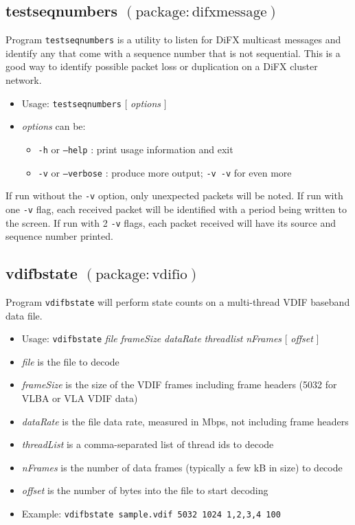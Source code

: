 \subsection{testseqnumbers {\small $\mathrm{(package: difxmessage)}$}} \label{sec:testsequnumbers} 

Program {\tt testseqnumbers} is a utility to listen for DiFX multicast messages and identify any that come with a sequence number that is not sequential.
This is a good way to identify possible packet loss or duplication on a DiFX cluster network.

\begin{itemize}
\item[] Usage: {\tt testseqnumbers} $[$ {\em options} $]$
\item[] {\em options} can be:
\begin{itemize}
\item[] {\tt -h} or {\tt --help} : print usage information and exit
\item[] {\tt -v} or {\tt --verbose} : produce more output; {\tt -v -v} for even more
\end{itemize}
\end{itemize}

If run without the {\tt -v} option, only unexpected packets will be noted.
If run with one {\tt -v} flag, each received packet will be identified with a period being written to the screen.
If run with 2 {\tt -v} flags, each packet received will have its source and sequence number printed.







\subsection{vdifbstate {\small $\mathrm{(package: vdifio)}$}} \label{sec:vbstate}

Program {\tt vdifbstate} will perform state counts on a multi-thread VDIF baseband data file.

\begin{itemize}
\item[] Usage: {\tt vdifbstate} {\em file} {\em frameSize} {\em dataRate} {\em threadlist} {\em nFrames} $[$ {\em offset} $]$ 
\item[] {\em file} is the file to decode
\item[] {\em frameSize} is the size of the VDIF frames including frame headers (5032 for VLBA or VLA VDIF data)
\item[] {\em dataRate} is the file data rate, measured in Mbps, not including frame headers
\item[] {\em threadList} is a comma-separated list of thread ids to decode
\item[] {\em nFrames} is the number of data frames (typically a few kB in size) to decode
\item[] {\em offset} is the number of bytes into the file to start decoding
\item[] Example: {\tt vdifbstate sample.vdif 5032 1024 1,2,3,4 100}
\end{itemize}

